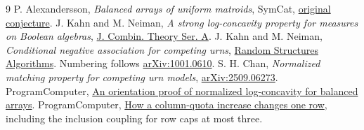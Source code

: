 \documentclass[11pt]{article}
\begin{document}
\begin{thebibliography}{9}
 P. Alexandersson, \emph{Balanced arrays of uniform matroids}, SymCat, \href{https://www.symmetricfunctions.com/realRootedOpenProblems.htm#conjBalancedArrays}{original conjecture}.
 J. Kahn and M. Neiman, \emph{A strong log-concavity property for measures on Boolean algebras}, \href{https://doi.org/10.1016/j.jcta.2011.02.007}{J. Combin. Theory Ser. A}.
 J. Kahn and M. Neiman, \emph{Conditional negative association for competing urns}, \href{https://doi.org/10.1002/rsa.20395}{Random Structures Algorithms}. Numbering follows \href{https://arxiv.org/abs/1001.0610}{arXiv:1001.0610}.
 S. H. Chan, \emph{Normalized matching property for competing urn models}, \href{https://arxiv.org/abs/2509.06273}{arXiv:2509.06273}.
 ProgramComputer, \href{https://github.com/ProgramComputer/open-math-research/blob/106ccf3/topics/balanced-arrays/orientation-normalization.md}{An orientation proof of normalized log-concavity for balanced arrays}.
 ProgramComputer, \href{https://github.com/ProgramComputer/open-math-research/tree/d67335eb435d232228e6165afa6c28f1e4670f50/topics/balanced-arrays/marked-row-likelihood}{How a column-quota increase changes one row}, including the inclusion coupling for row caps at most three.
\end{thebibliography}
\end{document}
